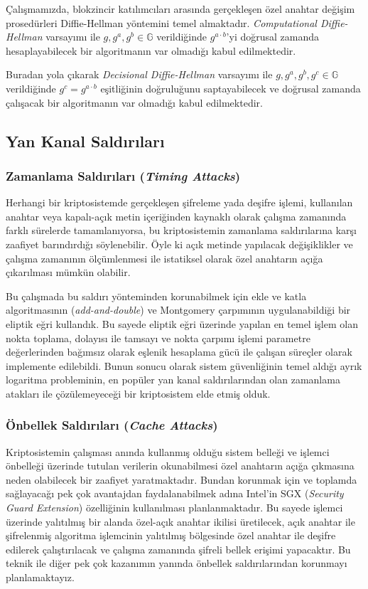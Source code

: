\documentclass[a4paper,11pt]{article}
\begin{document}
Çalışmamızda, blokzincir katılımcıları arasında gerçekleşen özel anahtar değişim prosedürleri Diffie-Hellman yöntemini temel almaktadır. \emph{Computational Diffie-Hellman} varsayımı ile $g,g^{a},g^{b} \in \mathbb{G}$ verildiğinde $g^{a \cdot b}$'yi doğrusal zamanda hesaplayabilecek bir algoritmanın var olmadığı kabul edilmektedir.

Buradan yola çıkarak \emph{Decisional Diffie-Hellman} varsayımı ile $g,g^{a},g^{b},g^{c} \in \mathbb{G}$ verildiğinde $g^{c}=g^{a \cdot b}$ eşitliğinin doğruluğunu saptayabilecek ve doğrusal zamanda çalışacak bir algoritmanın var olmadığı kabul edilmektedir.


\subsection{Yan Kanal Saldırıları}


\subsubsection{Zamanlama Saldırıları (\emph{Timing Attacks})}

Herhangi bir kriptosistemde gerçekleşen şifreleme yada deşifre işlemi, kullanılan anahtar veya kapalı-açık metin içeriğinden kaynaklı olarak çalışma zamanında farklı sürelerde tamamlanıyorsa, bu kriptosistemin zamanlama saldırılarına karşı zaafiyet barındırdığı söylenebilir. Öyle ki açık metinde yapılacak değişiklikler ve çalışma zamanının ölçümlenmesi ile istatiksel olarak özel anahtarın açığa çıkarılması mümkün olabilir.

Bu çalışmada bu saldırı yönteminden korunabilmek için ekle ve katla algoritmasının (\emph{add-and-double}) ve Montgomery çarpımının uygulanabildiği bir eliptik eğri kullandık. Bu sayede eliptik eğri üzerinde yapılan en temel işlem olan nokta toplama, dolayısı ile tamsayı ve nokta çarpımı işlemi parametre değerlerinden bağımsız olarak eşlenik hesaplama gücü ile çalışan süreçler olarak implemente edilebildi. Bunun sonucu olarak sistem güvenliğinin temel aldığı ayrık logaritma probleminin, en popüler yan kanal saldırılarından olan zamanlama atakları ile çözülemeyeceği bir kriptosistem elde etmiş olduk.


\subsubsection{Önbellek Saldırıları (\emph{Cache Attacks})}

Kriptosistemin çalışması anında kullanmış olduğu sistem belleği ve işlemci önbelleği üzerinde tutulan verilerin okunabilmesi özel anahtarın açığa çıkmasına neden olabilecek bir zaafiyet yaratmaktadır. Bundan korunmak için ve toplamda sağlayacağı pek çok avantajdan faydalanabilmek adına Intel'in SGX (\emph{Security Guard Extension}) özelliğinin kullanılması planlanmaktadır. Bu sayede işlemci üzerinde yalıtılmış bir alanda özel-açık anahtar ikilisi üretilecek, açık anahtar ile şifrelenmiş algoritma işlemcinin yalıtılmış bölgesinde özel anahtar ile deşifre edilerek çalıştırılacak ve çalışma zamanında şifreli bellek erişimi yapacaktır. Bu teknik ile diğer pek çok kazanımın yanında önbellek saldırılarından korunmayı planlamaktayız.
\end{document}
